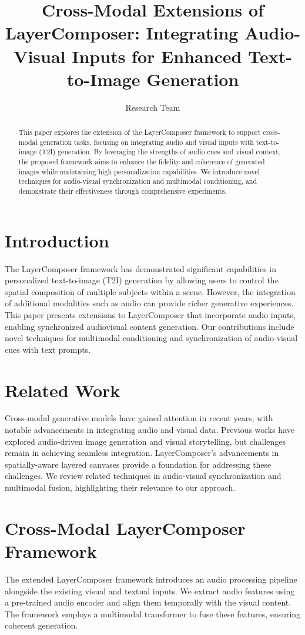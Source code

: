 \documentclass{article}
\title{Cross-Modal Extensions of LayerComposer: Integrating Audio-Visual Inputs for Enhanced Text-to-Image Generation}
\author{Research Team}
\begin{document}
\maketitle

\begin{abstract}
This paper explores the extension of the LayerComposer framework to support cross-modal generation tasks, focusing on integrating audio and visual inputs with text-to-image (T2I) generation. By leveraging the strengths of audio cues and visual context, the proposed framework aims to enhance the fidelity and coherence of generated images while maintaining high personalization capabilities. We introduce novel techniques for audio-visual synchronization and multimodal conditioning, and demonstrate their effectiveness through comprehensive experiments.
\end{abstract}

\section{Introduction}
The LayerComposer framework has demonstrated significant capabilities in personalized text-to-image (T2I) generation by allowing users to control the spatial composition of multiple subjects within a scene. However, the integration of additional modalities such as audio can provide richer generative experiences. This paper presents extensions to LayerComposer that incorporate audio inputs, enabling synchronized audiovisual content generation. Our contributions include novel techniques for multimodal conditioning and synchronization of audio-visual cues with text prompts.

\section{Related Work}
Cross-modal generative models have gained attention in recent years, with notable advancements in integrating audio and visual data. Previous works have explored audio-driven image generation and visual storytelling, but challenges remain in achieving seamless integration. LayerComposer's advancements in spatially-aware layered canvases provide a foundation for addressing these challenges. We review related techniques in audio-visual synchronization and multimodal fusion, highlighting their relevance to our approach.

\section{Cross-Modal LayerComposer Framework}
The extended LayerComposer framework introduces an audio processing pipeline alongside the existing visual and textual inputs. We extract audio features using a pre-trained audio encoder and align them temporally with the visual content. The framework employs a multimodal transformer to fuse these features, ensuring coherent generation.
\end{document}
